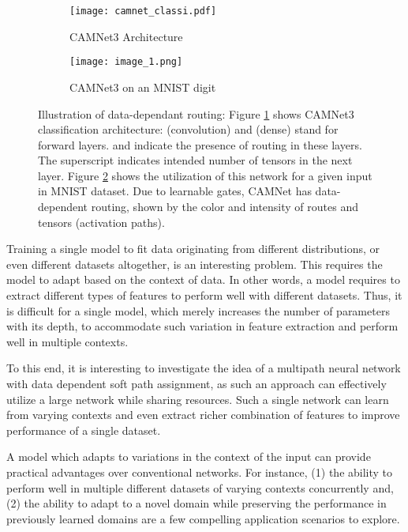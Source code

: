 \documentclass[10pt,twocolumn,letterpaper]{article}
\begin{document}
\begin{figure}[t]
	\begin{center}
		\begin{subfigure}[]{0.95\linewidth}
			\texttt{[image: camnet\_classi.pdf]} 
			\caption{CAMNet3 Architecture}
			\label{fig:1a}
		\end{subfigure}
		\begin{subfigure}[]{1\linewidth}
			\texttt{[image: image\_1.png]} 
			\caption{CAMNet3 on an MNIST digit}
			\label{fig:1b}
		\end{subfigure}
	\end{center}
	\vspace{-0.25in}
\caption{Illustration of data-dependant routing: Figure \ref{fig:1a} shows CAMNet3 classification architecture:  (convolution) and  (dense) stand for forward layers.  and  indicate the presence of routing in these layers. The superscript indicates intended number of tensors in the next layer.  Figure \ref{fig:1b} shows the utilization of this network for a given input in MNIST dataset. Due to learnable gates, CAMNet has data-dependent routing, shown by the color and intensity of routes and tensors (activation paths). }
	\label{fig:camnet_classi}
	\vspace{-0.15in}
\end{figure}

Training a single model to fit data originating from different distributions, or even different datasets altogether, is an interesting problem. This requires the model to adapt based on the context of data. In other words, a model requires to extract different types of features to perform well with different datasets. Thus, it is difficult for a single model, which merely increases the number of  parameters with its depth, to accommodate such variation in feature extraction and perform well in multiple contexts. 

To this end, it is interesting to investigate the idea of a multipath neural network with data dependent soft path assignment,
as such an approach can effectively utilize a large network while sharing resources. Such a single network can learn from varying contexts and even extract richer combination of features to improve performance of a single dataset. 






A model which adapts to variations in the context of the input can provide practical advantages over conventional networks. For instance, (1) the ability to perform well in multiple different datasets of varying contexts concurrently and, (2) the ability to adapt to a novel domain while preserving the performance in previously learned domains are a few compelling application scenarios to explore.
\end{document}
